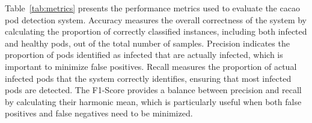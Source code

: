 Table~\ref{tab:metrics} presents the performance metrics used to evaluate the cacao pod detection system. Accuracy measures the overall correctness of the system by calculating the proportion of correctly classified instances, including both infected and healthy pods, out of the total number of samples. Precision indicates the proportion of pods identified as infected that are actually infected, which is important to minimize false positives. Recall measures the proportion of actual infected pods that the system correctly identifies, ensuring that most infected pods are detected. The F1-Score provides a balance between precision and recall by calculating their harmonic mean, which is particularly useful when both false positives and false negatives need to be minimized.